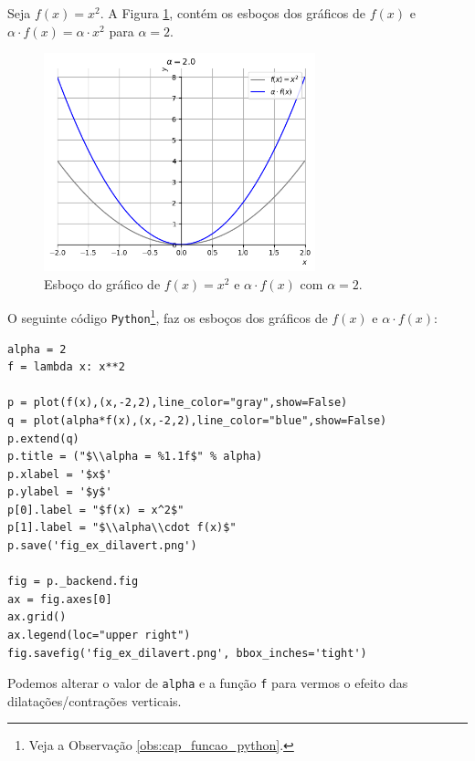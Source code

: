 \begin{ex}
  Seja $f(x) = x^2$. A Figura \ref{fig:ex_dilavert}, contém os esboços dos gráficos de $f(x)$ e $\alpha\cdot f(x) = \alpha \cdot x^2$ para $\alpha = 2$.

  \begin{figure}[H]
    \centering
    \includegraphics[width=0.7\textwidth]{./cap_funcao/dados/fig_ex_dilavert/fig_ex_dilavert}
    \caption{Esboço do gráfico de $f(x) = x^2$ e $\alpha\cdot f(x)$ com $\alpha=2$.}
    \label{fig:ex_dilavert}
  \end{figure}

  \ifispython
  O seguinte código \verb+Python+\footnote{Veja a Observação \ref{obs:cap_funcao_python}.}, faz os esboços dos gráficos de $f(x)$ e $\alpha\cdot f(x)$:
\begin{verbatim}
alpha = 2
f = lambda x: x**2

p = plot(f(x),(x,-2,2),line_color="gray",show=False)
q = plot(alpha*f(x),(x,-2,2),line_color="blue",show=False)
p.extend(q)
p.title = ("$\\alpha = %1.1f$" % alpha)
p.xlabel = '$x$'
p.ylabel = '$y$'
p[0].label = "$f(x) = x^2$"
p[1].label = "$\\alpha\\cdot f(x)$"
p.save('fig_ex_dilavert.png')

fig = p._backend.fig
ax = fig.axes[0]
ax.grid()
ax.legend(loc="upper right")
fig.savefig('fig_ex_dilavert.png', bbox_inches='tight')
\end{verbatim}
  Podemos alterar o valor de \verb+alpha+ e a função \verb+f+ para vermos o efeito das dilatações/contrações verticais.
  \fi
\end{ex}


